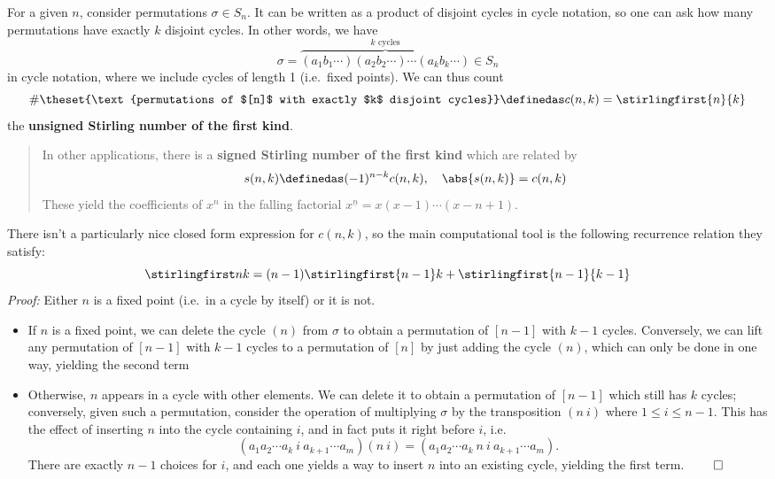 For a given \(n\), consider permutations \(\sigma \in S_n\). It can be
written as a product of disjoint cycles in cycle notation, so one can
ask how many permutations have exactly \(k\) disjoint cycles. In other
words, we have \[
\sigma = \overbrace{(a_1b_1\cdots)(a_2b_2\cdots)\cdots(a_kb_k\cdots)}^{k \text{ cycles}} \in S_n
\] in cycle notation, where we include cycles of length 1 (i.e.~fixed
points). We can thus count \[
\#\theset{\text{permutations of $[n]$ with exactly $k$ disjoint cycles}} \definedas c(n, k) = \stirlingfirst{n}{k}
\] the \textbf{unsigned Stirling number of the first kind}.

\begin{quote}
In other applications, there is a \textbf{signed Stirling number of the
first kind} which are related by \[
s(n, k) \definedas (-1)^{n-k}c(n, k), \quad \abs{s(n,k)} = c(n, k)
\] These yield the coefficients of \(x^n\) in the falling factorial
\(x^{\underline n} = x(x-1)\cdots(x-n+1)\).
\end{quote}

There isn't a particularly nice closed form expression for \(c(n, k)\),
so the main computational tool is the following recurrence relation they
satisfy: \[
\stirlingfirst n k = (n-1){\stirlingfirst {n-1} k} + \stirlingfirst{n-1}{k-1}
\] \emph{Proof:} Either \(n\) is a fixed point (i.e.~in a cycle by
itself) or it is not.

\begin{itemize}
\tightlist
\item
  If \(n\) is a fixed point, we can delete the cycle \((n)\) from
  \(\sigma\) to obtain a permutation of \([n-1]\) with \(k-1\) cycles.
  Conversely, we can lift any permutation of \([n-1]\) with \(k-1\)
  cycles to a permutation of \([n]\) by just adding the cycle \((n)\),
  which can only be done in one way, yielding the second term
\item
  Otherwise, \(n\) appears in a cycle with other elements. We can delete
  it to obtain a permutation of \([n-1]\) which still has \(k\) cycles;
  conversely, given such a permutation, consider the operation of
  multiplying \(\sigma\) by the transposition \((n~i)\) where
  \(1\leq i\leq n-1\). This has the effect of inserting \(n\) into the
  cycle containing \(i\), and in fact puts it right before \(i\), i.e.
  \[
  (a_1 a_2 \cdots a_{k}~ i ~ a_{k+1} \cdots a_m)(n~i) =  (a_1 a_2 \cdots a_{k}~ n ~ i ~ a_{k+1} \cdots a_m).
  \] There are exactly \(n-1\) choices for \(i\), and each one yields a
  way to insert \(n\) into an existing cycle, yielding the first term.
  \(\qed\)
\end{itemize}

